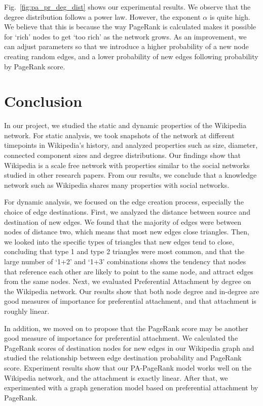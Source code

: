 \documentclass[10pt,twocolumn]{article}
\begin{document}
Fig.~\ref{fig:pa_pr_deg_dist} shows our experimental results. We observe that the degree distribution follows a power law. However, the exponent $\alpha$ is quite high. We believe that this is because the way PageRank is calculated makes it possible for `rich' nodes to get `too rich' as the network grows. As an improvement, we can adjust parameters so that we introduce a higher probability of a new node creating random edges, and a lower probability of new edges following probability by PageRank score.

\section{Conclusion} 
In our project, we studied the static and dynamic properties of the Wikipedia network. For static analysis, we took snapshots of the network at different timepoints in Wikipedia's history, and analyzed properties such as size, diameter, connected component sizes and degree distributions. Our findings show that Wikipedia is a scale free network with properties similar to the social networks studied in other research papers. From our results, we conclude that a knowledge network such as Wikipedia shares many properties with social networks.

For dynamic analysis, we focused on the edge creation process, especially the choice of edge destinations. First, we analyzed the distance between source and destination of new edges. We found that the majority of edges were between nodes of distance two, which means that most new edges close triangles. Then, we looked into the specific types of triangles that new edges tend to close, concluding that type 1 and type 2 triangles were most common, and that the large number of `1+2' and `1+3' combinations shows the tendency that nodes that reference each other are likely to point to the same node, and attract edges from the same nodes. Next, we evaluated Preferential Attachment by degree on the Wikipedia network. Our results show that both node degree and in-degree are good measures of importance for preferential attachment, and that attachment is roughly linear.

In addition, we moved on to propose that the PageRank score may be another good measure of importance for preferential attachment. We calculated the PageRank scores of destination nodes for new edges in our Wikipedia graph and studied the relationship between edge destination probability and PageRank score. Experiment results show that our PA-PageRank model works well on the Wikipedia network, and the attachment is exactly linear. After that, we experimented with a graph generation model based on preferential attachment by PageRank.



\end{document}
